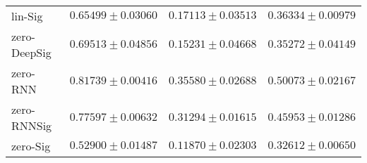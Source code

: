 \begin{tabular}{llll}
lin-Sig        &                           $ 0.65499 \pm 0.03060 $ &                           $ 0.17113 \pm 0.03513 $ &                           $ 0.36334 \pm 0.00979 $ \\
zero-DeepSig   &                           $ 0.69513 \pm 0.04856 $ &                           $ 0.15231 \pm 0.04668 $ &                           $ 0.35272 \pm 0.04149 $ \\
zero-RNN       &                           $ 0.81739 \pm 0.00416 $ &                           $ 0.35580 \pm 0.02688 $ &                           $ 0.50073 \pm 0.02167 $ \\
zero-RNNSig    &                           $ 0.77597 \pm 0.00632 $ &                           $ 0.31294 \pm 0.01615 $ &                           $ 0.45953 \pm 0.01286 $ \\
zero-Sig       &                           $ 0.52900 \pm 0.01487 $ &                           $ 0.11870 \pm 0.02303 $ &                           $ 0.32612 \pm 0.00650 $ \\
\bottomrule
\end{tabular}
